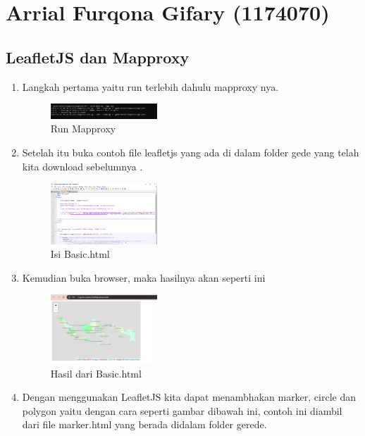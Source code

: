 \section{Arrial Furqona Gifary (1174070)}
\subsection{LeafletJS dan Mapproxy}
\begin{enumerate}
    \item Langkah pertama yaitu run terlebih dahulu mapproxy nya.
  \hfill\break
  \begin{figure}[H]
  \includegraphics[width=4cm]{figures/tugas5/1174070/1.png}
  \centering
  \caption{Run Mapproxy}
  \end{figure}
    
   

    \item Setelah itu buka contoh file leafletjs yang ada di dalam folder gede  yang telah kita download sebelumnya .
    
  \hfill\break
  \begin{figure}[H]
  \includegraphics[width=4cm]{figures/tugas5/1174070/2.png}
  \centering
  \caption{Isi Basic.html}
  \end{figure}
    
    \item Kemudian buka browser, maka hasilnya akan seperti ini
    
  \hfill\break
  \begin{figure}[H]
  \includegraphics[width=4cm]{figures/tugas5/1174070/3.png}
  \centering
  \caption{Hasil dari Basic.html}
  \end{figure}
  
   \item Dengan menggunakan LeafletJS kita dapat menambhakan marker, circle dan polygon yaitu dengan cara seperti gambar dibawah ini, contoh ini diambil dari file marker.html yang berada didalam folder gerede.
    

\end{enumerate}
